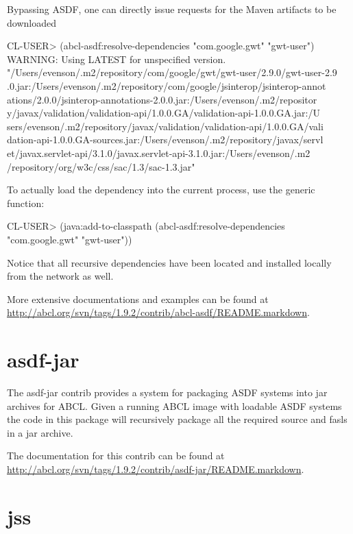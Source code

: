 \documentclass[10pt]{book}
\begin{document}
Bypassing \textsc{ASDF}, one can directly issue requests for the Maven
artifacts to be downloaded

\begin{listing-lisp}
CL-USER> (abcl-asdf:resolve-dependencies "com.google.gwt"
                                         "gwt-user")
WARNING: Using LATEST for unspecified version.
"/Users/evenson/.m2/repository/com/google/gwt/gwt-user/2.9.0/gwt-user-2.9
.0.jar:/Users/evenson/.m2/repository/com/google/jsinterop/jsinterop-annot
ations/2.0.0/jsinterop-annotations-2.0.0.jar:/Users/evenson/.m2/repositor
y/javax/validation/validation-api/1.0.0.GA/validation-api-1.0.0.GA.jar:/U
sers/evenson/.m2/repository/javax/validation/validation-api/1.0.0.GA/vali
dation-api-1.0.0.GA-sources.jar:/Users/evenson/.m2/repository/javax/servl
et/javax.servlet-api/3.1.0/javax.servlet-api-3.1.0.jar:/Users/evenson/.m2
/repository/org/w3c/css/sac/1.3/sac-1.3.jar"
\end{listing-lisp}

To actually load the dependency into the current process, use the
 generic function:

\begin{listing-lisp}
CL-USER> (java:add-to-classpath
          (abcl-asdf:resolve-dependencies "com.google.gwt"
                                          "gwt-user"))
\end{listing-lisp}

Notice that all recursive dependencies have been located and installed
locally from the network as well.

More extensive documentations and examples can be found at
\url{http://abcl.org/svn/tags/1.9.2/contrib/abcl-asdf/README.markdown}.

\section{asdf-jar}
\label{section:asdf-jar}

The asdf-jar contrib provides a system for packaging \textsc{ASDF}
systems into jar archives for \textsc{ABCL}.  Given a running
\textsc{ABCL} image with loadable \textsc{ASDF} systems the code in
this package will recursively package all the required source and
fasls in a jar archive.

The documentation for this contrib can be found at
\url{http://abcl.org/svn/tags/1.9.2/contrib/asdf-jar/README.markdown}.

\section{jss}
\label{section:jss}
\end{document}
